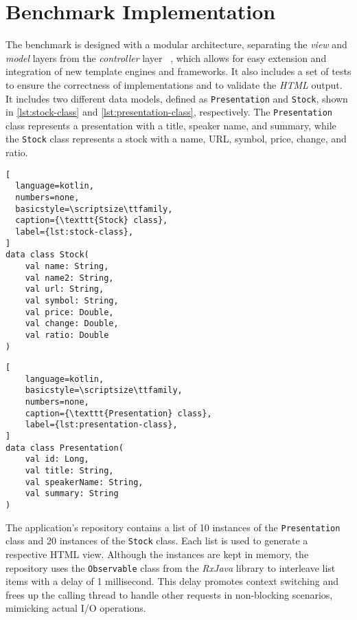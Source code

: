 \section{Benchmark Implementation}

The benchmark is designed with a modular architecture, separating the
\textit{view} and \textit{model} layers from the \textit{controller} layer
~\cite{Bucanek2009}, which allows for easy extension and integration of new
template engines and frameworks. It also includes a set of tests to ensure the
correctness of implementations and to validate the \textit{HTML} output. It
includes two different data models, defined as \texttt{Presentation} and
\texttt{Stock}, shown in \autoref{lst:stock-class} and
\autoref{lst:presentation-class}, respectively. The \texttt{Presentation} class
represents a presentation with a title, speaker name, and summary, while the
\texttt{Stock} class represents a stock with a name, URL, symbol, price,
change, and ratio.

\begin{center}
\begin{minipage}{0.48\textwidth}
  \begin{lstlisting}[
  language=kotlin,
  numbers=none,
  basicstyle=\scriptsize\ttfamily,
  caption={\texttt{Stock} class},
  label={lst:stock-class},
]
data class Stock(
    val name: String,
    val name2: String,
    val url: String,
    val symbol: String,
    val price: Double, 
    val change: Double, 
    val ratio: Double
)
\end{lstlisting}
\end{minipage}
\hfill
\begin{minipage}{0.48\textwidth}
  \begin{lstlisting}[
    language=kotlin,
    basicstyle=\scriptsize\ttfamily,
    numbers=none,
    caption={\texttt{Presentation} class},
    label={lst:presentation-class},
]
data class Presentation(
    val id: Long,
    val title: String, 
    val speakerName: String,
    val summary: String
)
\end{lstlisting}
\end{minipage}
\end{center}


The application's repository contains a list of 10 instances of the
\texttt{Presentation} class and 20 instances of the \texttt{Stock} class. Each
list is used to generate a respective HTML view. Although the instances are
kept in memory, the repository uses the \texttt{Observable} class from the
\textit{RxJava} library to interleave list items with a delay of 1 millisecond.
This delay promotes context switching and frees up the calling thread to handle
other requests in non-blocking scenarios, mimicking actual I/O operations.

